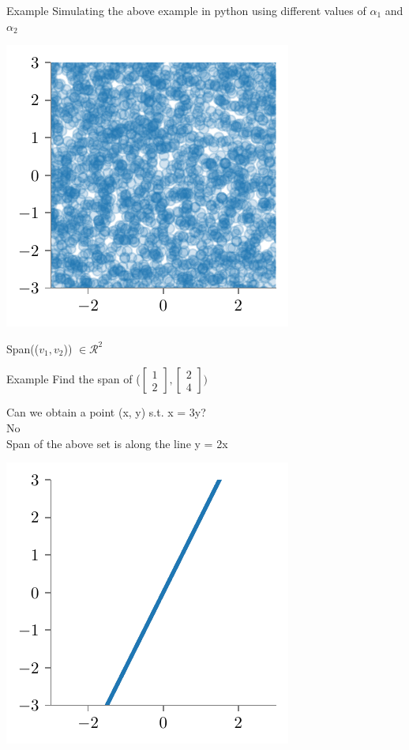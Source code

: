 \documentclass{beamer}
\begin{document}
\begin{frame}{Example}
    Simulating the above example in python using different values of $\alpha_1$ and $\alpha_2$


    \includegraphics{../figures/linear-regression/geoemetric-span-3.pdf}
    
    Span(($v_1, v_2$)) $\in \mathcal{R}^2$
\end{frame}


\begin{frame}{Example}
Find the span of ($\begin{bmatrix}
1 \\2
\end{bmatrix}, \begin{bmatrix}
2 \\4
\end{bmatrix}) $

\pause Can we obtain a point (x, y) s.t. x = 3y? \\
\pause No \\ 
\pause Span of the above set is along the line y = 2x

\includegraphics[scale=0.6]{../figures/linear-regression/geoemetric-span-4.pdf}


\end{frame}
\end{document}
